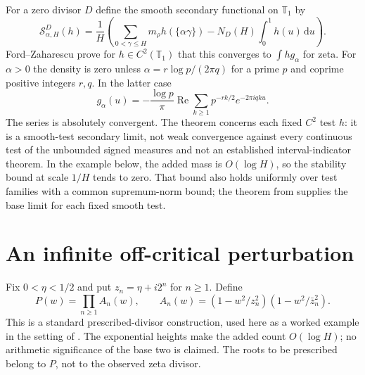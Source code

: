\documentclass[11pt,a4paper]{article}
\theoremstyle{definition}
\theoremstyle{remark}
\newcommand{\T}{\mathbb T}
\newcommand{\dd}{\,\mathrm d}
\DeclareMathOperator{\Rea}{Re}
\begin{document}
For a zero divisor $D$ define the smooth secondary functional on $\T_1$ by
\begin{equation}\label{eq:secondary}
 \mathcal S_{\alpha,H}^{D}(h)=\frac1H
 \left(\sum_{0<\gamma\le H}m_\rho h(\{\alpha\gamma\})
              -N_D(H)\int_0^1h(u)\dd u\right).
\end{equation}
Ford--Zaharescu \cite[Theorem 1 and Corollary 2]{FZ} prove for
$h\in C^2(\T_1)$ that this converges to $\int h g_\alpha$ for zeta.
For $\alpha>0$ the density is zero unless
$\alpha=r\log p/(2\pi q)$ for a prime $p$ and coprime positive integers
$r,q$. In the latter case
\begin{equation}\label{eq:bias}
 g_\alpha(u)=-\frac{\log p}{\pi}\Rea
       \sum_{k\ge1}p^{-rk/2}e^{-2\pi i qku}.
\end{equation}
The series is absolutely convergent. The theorem concerns each fixed
$C^2$ test $h$: it is a smooth-test secondary limit, not weak convergence
against every continuous test of the unbounded signed measures and not an
established interval-indicator theorem. In the example below, the added mass
is $O(\log H)$, so the stability bound at scale $1/H$ tends to zero.
That bound also holds uniformly over test families with a common supremum-norm
bound; the theorem from \cite{FZ} supplies the base limit for each fixed smooth test.

\section{An infinite off-critical perturbation}\label{sec:product}

Fix $0<\eta<1/2$ and put $z_n=\eta+i2^n$ for $n\ge1$. Define
\begin{equation}\label{eq:product}
 P(w)=\prod_{n\ge1}A_n(w),\qquad
 A_n(w)=(1-w^2/z_n^2)(1-w^2/\bar z_n^2).
\end{equation}
This is a standard prescribed-divisor construction, used here as a worked
example in the setting of \cite{GX}. The exponential heights make the added
count $O(\log H)$; no arithmetic significance of the base two is claimed.
The roots to be prescribed belong to $P$, not to the observed zeta divisor.
\end{document}
